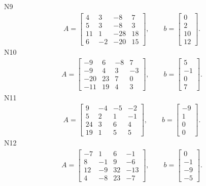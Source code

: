\documentclass[11pt]{report}
\begin{document}
N9
\begin{align*}
 A = \left[\begin{matrix}4 & 3 & -8 & 7\\5 & 3 & -8 & 3\\11 & 1 & -28 & 18\\6 & -2 & -20 & 15\end{matrix}\right],
\qquad b = \left[\begin{matrix}0\\2\\10\\12\end{matrix}\right]. 
 \end{align*}
N10
\begin{align*}
 A = \left[\begin{matrix}-9 & 6 & -8 & 7\\-9 & 4 & 3 & -3\\-20 & 23 & 7 & 0\\-11 & 19 & 4 & 3\end{matrix}\right],
\qquad b = \left[\begin{matrix}5\\-1\\0\\7\end{matrix}\right]. 
 \end{align*}
N11
\begin{align*}
 A = \left[\begin{matrix}9 & -4 & -5 & -2\\5 & 2 & 1 & -1\\24 & 3 & 6 & 4\\19 & 1 & 5 & 5\end{matrix}\right],
\qquad b = \left[\begin{matrix}-9\\1\\0\\0\end{matrix}\right]. 
 \end{align*}
N12
\begin{align*}
 A = \left[\begin{matrix}-7 & 1 & 6 & -1\\8 & -1 & 9 & -6\\12 & -9 & 32 & -13\\4 & -8 & 23 & -7\end{matrix}\right],
\qquad b = \left[\begin{matrix}0\\-1\\-9\\-5\end{matrix}\right]. 
 \end{align*}
\end{document}
